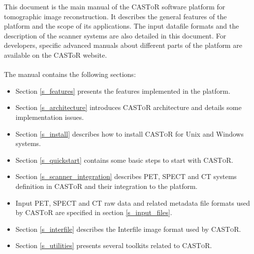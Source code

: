 \documentclass[a4paper, 11pt]{article}
\newcommand{\castor}{\textsc{CASToR}\xspace}
\begin{document}
This document is the main manual of the \castor software platform for tomographic image reconstruction.
It describes the general features of the platform and the scope of its applications.
The input datafile formats and the description of the scanner systems are also detailed in this document.
For developers, specific advanced manuals about different parts of the platform are available on the CASToR website.\\
\\
The manual contains the following sections:
\begin{itemize}
  \item Section \ref{s_features} presents the features implemented in the platform. 
  \item Section \ref{s_architecture} introduces \castor architecture and details some implementation issues. 
  \item Section \ref{s_install} describes how to install \castor for Unix and Windows systems.
  \item Section \ref{s_quickstart} contains some basic steps to start with \castor. 
  \item Section \ref{s_scanner_integration} describes PET, SPECT and CT systems definition in \castor and their integration to the platform.
  \item Input PET, SPECT and CT raw data and related metadata file formats used by \castor are specified in section \ref{s_input_files}. 
  \item Section \ref{s_interfile} describes the Interfile image format used by \castor.
  \item Section \ref{s_utilities} presents several toolkits related to \castor.
\end{itemize}


\newpage
\end{document}
